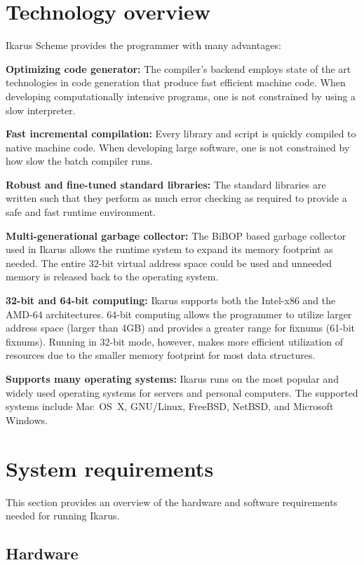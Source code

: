 \documentclass[onecolumn, 12pt, twoside, openright, dvipdfm]{book}
\begin{document}
\newpage

\section{Technology overview}

Ikarus Scheme provides the programmer with many advantages:

\textbf{Optimizing code generator:}  The compiler's backend employs
state of the art technologies in code generation that produce fast
efficient machine code.  When developing computationally intensive
programs, one is not constrained by using a slow interpreter.

\textbf{Fast incremental compilation:}  Every library and script is
quickly compiled to native machine code.  When developing large
software, one is not constrained by how slow the batch compiler
runs.

\textbf{Robust and fine-tuned standard libraries:}  The standard
libraries are written such that they perform as much error checking
as required to provide a safe and fast runtime environment. 

\textbf{Multi-generational garbage collector:} The
BiBOP\cite{dybvig:sm} based garbage collector used in Ikarus allows
the runtime system to expand its memory footprint as needed.  The
entire 32-bit virtual address space could be used and unneeded
memory is released back to the operating system.

\textbf{32-bit and 64-bit computing:} Ikarus supports both the
Intel-x86 and the AMD-64 architectures.  64-bit computing allows the
programmer to utilize larger address space (larger than 4GB) and
provides a greater range for fixnums (61-bit fixnums).  Running in
32-bit mode, however, makes more efficient utilization of resources
due to the smaller memory footprint for most data structures.

\textbf{Supports many operating systems:} Ikarus runs on the most
popular and widely used operating systems for servers and personal
computers.  The supported systems include Mac~OS~X,
GNU/Linux, FreeBSD, NetBSD, and Microsoft Windows.


\section{System requirements}

This section provides an overview of the hardware and software
requirements needed for running Ikarus.

\subsection{Hardware}
\end{document}
